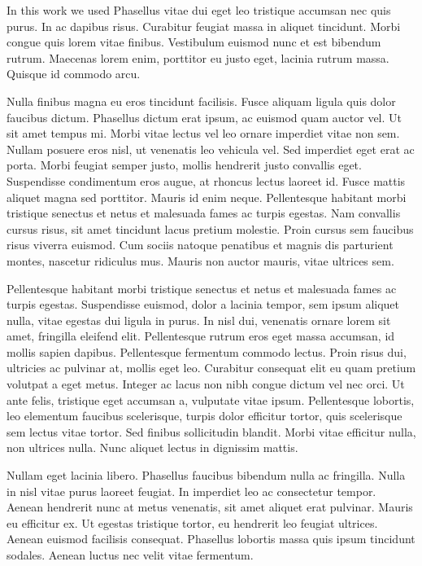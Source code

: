\documentclass[book,A4paper,10pt,twoside,oldfontcommands]{memoir}\usepackage[]{graphicx}\usepackage[usenames,dvipsnames]{color}
\begin{document}
In this work we used Phasellus vitae dui eget leo tristique accumsan
nec quis purus. In ac dapibus risus. Curabitur feugiat massa in
aliquet tincidunt. Morbi congue quis lorem vitae finibus. Vestibulum
euismod nunc et est bibendum rutrum. Maecenas lorem enim, porttitor eu
justo eget, lacinia rutrum massa. Quisque id commodo arcu. 

Nulla finibus magna eu eros tincidunt facilisis. Fusce aliquam ligula
quis dolor faucibus dictum. Phasellus dictum erat ipsum, ac euismod
quam auctor vel. Ut sit amet tempus mi. Morbi vitae lectus vel leo
ornare imperdiet vitae non sem. Nullam posuere eros nisl, ut venenatis
leo vehicula vel. Sed imperdiet eget erat ac porta. Morbi feugiat
semper justo, mollis hendrerit justo convallis eget. Suspendisse
condimentum eros augue, at rhoncus lectus laoreet id. Fusce mattis
aliquet magna sed porttitor. Mauris id enim neque. Pellentesque
habitant morbi tristique senectus et netus et malesuada fames ac
turpis egestas. Nam convallis cursus risus, sit amet tincidunt lacus
pretium molestie. Proin cursus sem faucibus risus viverra euismod. Cum
sociis natoque penatibus et magnis dis parturient montes, nascetur
ridiculus mus. Mauris non auctor mauris, vitae ultrices sem. 

Pellentesque habitant morbi tristique senectus et netus et malesuada
fames ac turpis egestas. Suspendisse euismod, dolor a lacinia tempor,
sem ipsum aliquet nulla, vitae egestas dui ligula in purus. In nisl
dui, venenatis ornare lorem sit amet, fringilla eleifend elit.
Pellentesque rutrum eros eget massa accumsan, id mollis sapien
dapibus. Pellentesque fermentum commodo lectus. Proin risus dui,
ultricies ac pulvinar at, mollis eget leo. Curabitur consequat elit eu
quam pretium volutpat a eget metus. Integer ac lacus non nibh congue
dictum vel nec orci. Ut ante felis, tristique eget accumsan a,
vulputate vitae ipsum. Pellentesque lobortis, leo elementum faucibus
scelerisque, turpis dolor efficitur tortor, quis scelerisque sem
lectus vitae tortor. Sed finibus sollicitudin blandit. Morbi vitae
efficitur nulla, non ultrices nulla. Nunc aliquet lectus in dignissim
mattis. 

Nullam eget lacinia libero. Phasellus faucibus bibendum nulla ac
fringilla. Nulla in nisl vitae purus laoreet feugiat. In imperdiet leo
ac consectetur tempor. Aenean hendrerit nunc at metus venenatis, sit
amet aliquet erat pulvinar. Mauris eu efficitur ex. Ut egestas
tristique tortor, eu hendrerit leo feugiat ultrices. Aenean euismod
facilisis consequat. Phasellus lobortis massa quis ipsum tincidunt
sodales. Aenean luctus nec velit vitae fermentum. 
\end{document}
